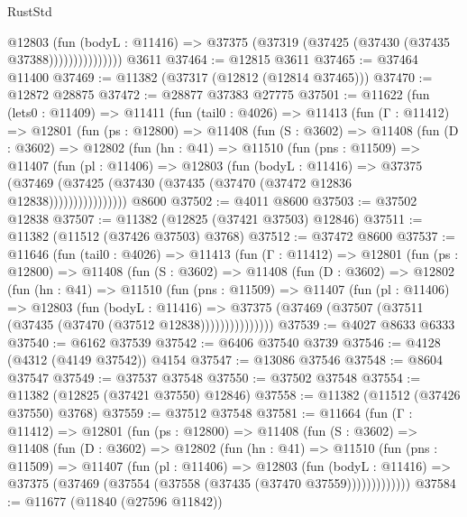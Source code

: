\begin{lexlean}{RustStd}
\begin{coremodule}
                      @12803
                        (fun (bodyL : @11416) =>
                        @37375 (@37319 (@37425 (@37430 (@37435 @37388)))))))))))))))
    @3611
@37464 := @12815 @3611
@37465 := @37464 @11400
@37469 := @11382 (@37317 (@12812 (@12814 @37465)))
@37470 := @12872 @28875
@37472 := @28877 @37383 @27775
@37501 := @11622
    (fun (lets0 : @11409) =>
    @11411
      (fun (tail0 : @4026) =>
      @11413
        (fun (Γ : @11412) =>
        @12801
          (fun (ps : @12800) =>
          @11408
            (fun (S : @3602) =>
            @11408
              (fun (D : @3602) =>
              @12802
                (fun (hn : @41) =>
                @11510
                  (fun (pns : @11509) =>
                  @11407
                    (fun (pl : @11406) =>
                    @12803
                      (fun (bodyL : @11416) =>
                      @37375
                        (@37469
                          (@37425 (@37430 (@37435 (@37470 (@37472 @12836 @12838))))))))))))))))
    @8600
@37502 := @4011 @8600
@37503 := @37502 @12838
@37507 := @11382 (@12825 (@37421 @37503) @12846)
@37511 := @11382 (@11512 (@37426 @37503) @3768)
@37512 := @37472 @8600
@37537 := @11646
    (fun (tail0 : @4026) =>
    @11413
      (fun (Γ : @11412) =>
      @12801
        (fun (ps : @12800) =>
        @11408
          (fun (S : @3602) =>
          @11408
            (fun (D : @3602) =>
            @12802
              (fun (hn : @41) =>
              @11510
                (fun (pns : @11509) =>
                @11407
                  (fun (pl : @11406) =>
                  @12803
                    (fun (bodyL : @11416) =>
                    @37375 (@37469 (@37507 (@37511 (@37435 (@37470 (@37512 @12838)))))))))))))))
@37539 := @4027 @8633 @6333
@37540 := @6162 @37539
@37542 := @6406 @37540 @3739
@37546 := @4128 (@4312 (@4149 @37542)) @4154
@37547 := @13086 @37546
@37548 := @8604 @37547
@37549 := @37537 @37548
@37550 := @37502 @37548
@37554 := @11382 (@12825 (@37421 @37550) @12846)
@37558 := @11382 (@11512 (@37426 @37550) @3768)
@37559 := @37512 @37548
@37581 := @11664
    (fun (Γ : @11412) =>
    @12801
      (fun (ps : @12800) =>
      @11408
        (fun (S : @3602) =>
        @11408
          (fun (D : @3602) =>
          @12802
            (fun (hn : @41) =>
            @11510
              (fun (pns : @11509) =>
              @11407
                (fun (pl : @11406) =>
                @12803
                  (fun (bodyL : @11416) =>
                  @37375 (@37469 (@37554 (@37558 (@37435 (@37470 @37559)))))))))))))
@37584 := @11677 (@11840 (@27596 @11842))

\end{coremodule}
\end{lexlean}
